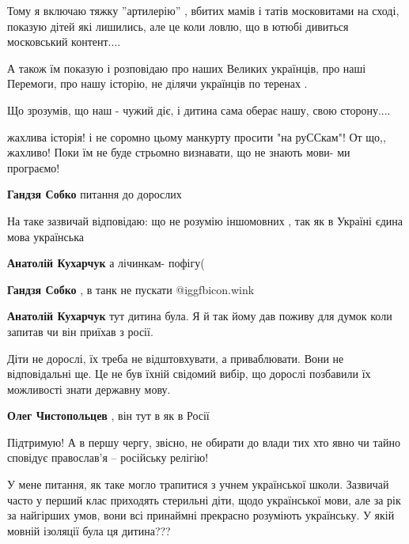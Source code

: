 \begin{itemize}
\begin{itemize}
Тому я включаю тяжку ''артилерію'' , вбитих мамів і татів московитами на сході,
показую дітей які лишились, але це коли ловлю, що в ютюбі дивиться московський
контент....

А також їм показую і розповідаю про наших Великих українців, про наші Перемоги,
про нашу історію, не ділячи українців по теренах .

Що зрозумів, що наш - чужий діє, і дитина сама оберає нашу, свою сторону....

\end{itemize} %

жахлива історія!
і не соромно цьому манкурту просити "на руССкам"!
От що,, жахливо!
Поки їм не буде стрьомно визнавати, що не знають мови- ми програємо!

\begin{itemize} %
\textbf{Гандзя Собко} питання до дорослих
\end{itemize} %




На таке зазвичай відповідаю: що не розумію іншомовних , так як в Україні єдина
мова українська

\begin{itemize} %
\textbf{Анатолій Кухарчук} а лічинкам- пофігу(

\textbf{Гандзя Собко} , в танк не пускати @igg{fbicon.wink} 

\textbf{Анатолій Кухарчук} тут дитина була. Я й так йому дав поживу для думок коли запитав чи він приїхав з росії.


Діти не дорослі, їх треба не відштовхувати, а приваблювати. Вони не
відповідальні ще. Це не був їхній свідомий вибір, що дорослі позбавили їх
можливості знати державну мову.

\textbf{Олег Чистопольцев} , він тут в як в Росії
\end{itemize} %

Підтримую! А в першу чергу, звісно, не обирати до влади тих хто явно чи тайно сповідує православ'я – російську релігію!


У мене питання, як таке могло трапитися з учнем української школи. Зазвичай
часто у перший клас приходять стерильні діти, щодо української мови, але за рік
за найгірших умов, вони всі принаймні прекрасно розуміють українську. У якій
мовній ізоляції була ця дитина???


\end{itemize}
